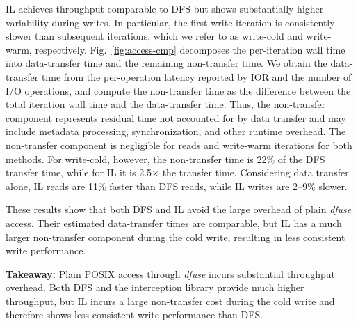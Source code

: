 IL achieves throughput comparable to DFS but shows substantially higher variability during writes. In particular, the first write iteration is consistently slower than subsequent iterations, which we refer to as write-cold and write-warm, respectively. Fig.~\ref{fig:access-cmp} decomposes the per-iteration wall time into data-transfer time and the remaining non-transfer time. We obtain the data-transfer time from the per-operation latency reported by IOR and the number of I/O operations, and compute the non-transfer time as the difference between the total iteration wall time and the data-transfer time. Thus, the non-transfer component represents residual time not accounted for by data transfer and may include metadata processing, synchronization, and other runtime overhead. The non-transfer component is negligible for reads and write-warm iterations for both methods. For write-cold, however, the non-transfer time is 22\% of the DFS transfer time, while for IL it is 2.5$\times$ the transfer time. Considering data transfer alone, IL reads are 11\% faster than DFS reads, while IL writes are 2--9\% slower.

These results show that both DFS and IL avoid the large overhead of plain \textit{dfuse} access. Their estimated data-transfer times are comparable, but IL has a much larger non-transfer component during the cold write, resulting in less consistent write performance.

\begin{takeaway}
\textbf{Takeaway:} Plain POSIX access through \textit{dfuse} incurs substantial throughput overhead. Both DFS and the interception library provide much higher throughput, but IL incurs a large non-transfer cost during the cold write and therefore shows less consistent write performance than DFS.
\end{takeaway}







